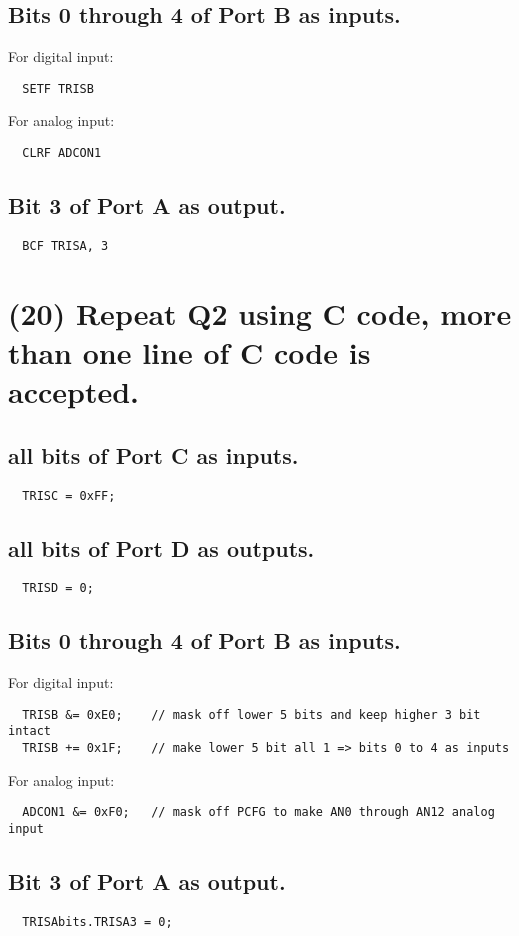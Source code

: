 \documentclass{article}
\begin{document}
\subsection{Bits 0 through 4 of Port B as inputs.}
For digital input:
\begin{verbatim}
  SETF TRISB
\end{verbatim}
For analog input:
\begin{verbatim}
  CLRF ADCON1
\end{verbatim}
\subsection{Bit 3 of Port A as output.}
\begin{verbatim}
  BCF TRISA, 3
\end{verbatim}

\newpage

\section{(20) Repeat Q2 using C code, more than one line of C code is accepted.}

\subsection{all bits of Port C as inputs.}
\begin{verbatim}
  TRISC = 0xFF;
\end{verbatim}
\subsection{all bits of Port D as outputs.}
\begin{verbatim}
  TRISD = 0;
\end{verbatim}
\subsection{Bits 0 through 4 of Port B as inputs.}
For digital input:
\begin{verbatim}
  TRISB &= 0xE0;    // mask off lower 5 bits and keep higher 3 bit intact
  TRISB += 0x1F;    // make lower 5 bit all 1 => bits 0 to 4 as inputs
\end{verbatim}
For analog input:
\begin{verbatim}
  ADCON1 &= 0xF0;   // mask off PCFG to make AN0 through AN12 analog input
\end{verbatim}
\subsection{Bit 3 of Port A as output.}
\begin{verbatim}
  TRISAbits.TRISA3 = 0;
\end{verbatim}
\end{document}
